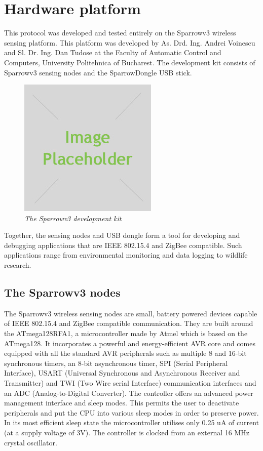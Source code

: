 
\chapter{Hardware platform}

This protocol was developed and tested entirely on the Sparrowv3 wireless
sensing platform. This platform was developed by As. Drd. Ing. Andrei Voinescu 
and Sl. Dr. Ing. Dan Tudose at the Faculty of Automatic Control and Computers, 
University Politehnica of Bucharest. The development kit consists of Sparrowv3 
sensing nodes and the SparrowDongle USB stick.

\begin{figure}[ht]
	\begin{center}
		\includegraphics{img/placeholder.jpg}
	\end{center}
	\caption{\small \itshape{The Sparrowv3 development kit}}
\end{figure}

Together, the sensing nodes and USB dongle form a tool for developing and
debugging applications that are IEEE 802.15.4 and ZigBee compatible. Such
applications range from environmental monitoring and data logging to wildlife
research.

\section{The Sparrowv3 nodes}

The Sparrowv3 wireless sensing nodes are small, battery powered devices capable
of IEEE 802.15.4 and ZigBee compatible communication. They are built around
the \mbox{ATmega128RFA1}, a microcontroller made by Atmel which is based on the
\mbox{ATmega128}. It incorporates a powerful and energy-efficient AVR
core and comes equipped with all the standard AVR peripherals such as multiple 
8 and 16-bit synchronous timers, an 8-bit asynchronous timer, SPI (Serial
Peripheral Interface), USART (Universal Synchronous and Asynchronous Receiver
and Transmitter) and TWI (Two Wire serial Interface) communication interfaces 
and an ADC (Analog-to-Digital Converter). The controller offers an advanced power 
management interface and sleep modes. This permits the user to deactivate 
peripherals and put the CPU into various sleep modes in order to preserve 
power. In its most efficient sleep state the microcontroller utilises only 
0.25 uA of current (at a supply voltage of 3V). The controller is clocked from an
external 16 MHz crystal oscillator.

